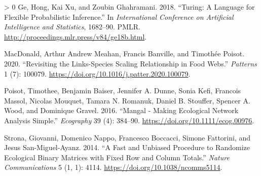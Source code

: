 \documentclass[10pt,oneside]{article}
\newlength{\cslhangindent}
\newenvironment{CSLReferences}[3] %
 {%
  \setlength{\parindent}{0pt}
  \ifodd #1 \everypar{\setlength{\hangindent}{\cslhangindent}}\ignorespaces\fi
  \ifnum #2 > 0
  \setlength{\parskip}{#2\baselineskip}
  \fi
 }%
 {}
\begin{document}
\hypertarget{refs}{}
\begin{CSLReferences}{1}{0}
\leavevmode\hypertarget{ref-Ge2018TurLan}{}%
Ge, Hong, Kai Xu, and Zoubin Ghahramani. 2018. {``Turing: A Language for
Flexible Probabilistic Inference.''} In \emph{International Conference
on Artificial Intelligence and Statistics}, 1682--90. PMLR.
\url{http://proceedings.mlr.press/v84/ge18b.html}.

\leavevmode\hypertarget{ref-MacDonald2020RevLina}{}%
MacDonald, Arthur Andrew Meahan, Francis Banville, and Timothée Poisot.
2020. {``Revisiting the Links-Species Scaling Relationship in Food
Webs.''} \emph{Patterns} 1 (7): 100079.
\url{https://doi.org/10.1016/j.patter.2020.100079}.

\leavevmode\hypertarget{ref-Poisot2016ManMak}{}%
Poisot, Timothee, Benjamin Baiser, Jennifer A. Dunne, Sonia Kefi,
Francois Massol, Nicolas Mouquet, Tamara N. Romanuk, Daniel B. Stouffer,
Spencer A. Wood, and Dominique Gravel. 2016. {``Mangal - Making
Ecological Network Analysis Simple.''} \emph{Ecography} 39 (4): 384--90.
\url{https://doi.org/10.1111/ecog.00976}.

\leavevmode\hypertarget{ref-Strona2014FasUnb}{}%
Strona, Giovanni, Domenico Nappo, Francesco Boccacci, Simone Fattorini,
and Jesus San-Miguel-Ayanz. 2014. {``A Fast and Unbiased Procedure to
Randomize Ecological Binary Matrices with Fixed Row and Column
Totals.''} \emph{Nature Communications} 5 (1, 1): 4114.
\url{https://doi.org/10.1038/ncomms5114}.

\end{CSLReferences}
\end{document}
